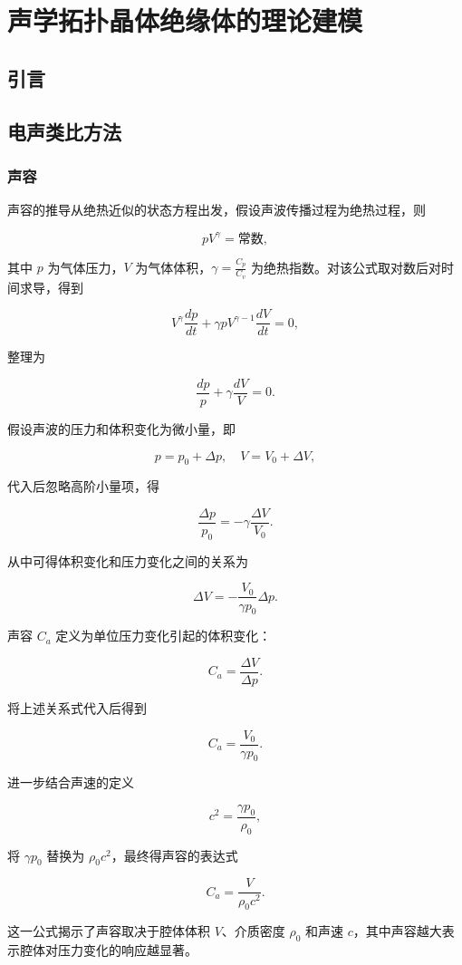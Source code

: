 \chapter{声学拓扑晶体绝缘体的理论建模}
\section{引言}

\section{电声类比方法}
\subsection{声容}
声容的推导从绝热近似的状态方程出发，假设声波传播过程为绝热过程，则

\[
pV^\gamma = \text{常数},
\]

其中 \(p\) 为气体压力，\(V\) 为气体体积，\(\gamma = \frac{C_p}{C_v}\) 为绝热指数。对该公式取对数后对时间求导，得到

\[
V^\gamma \frac{dp}{dt} + \gamma p V^{\gamma-1} \frac{dV}{dt} = 0,
\]

整理为

\[
\frac{dp}{p} + \gamma \frac{dV}{V} = 0.
\]

假设声波的压力和体积变化为微小量，即

\[
p = p_0 + \Delta p, \quad V = V_0 + \Delta V,
\]

代入后忽略高阶小量项，得

\[
\frac{\Delta p}{p_0} = -\gamma \frac{\Delta V}{V_0}.
\]

从中可得体积变化和压力变化之间的关系为

\[
\Delta V = -\frac{V_0}{\gamma p_0} \Delta p.
\]

声容 \(C_a\) 定义为单位压力变化引起的体积变化：

\[
C_a = \frac{\Delta V}{\Delta p}.
\]

将上述关系式代入后得到

\[
C_a = \frac{V_0}{\gamma p_0}.
\]

进一步结合声速的定义

\[
c^2 = \frac{\gamma p_0}{\rho_0},
\]

将 \(\gamma p_0\) 替换为 \(\rho_0 c^2\)，最终得声容的表达式

\[
C_a = \frac{V}{\rho_0 c^2}.
\]

这一公式揭示了声容取决于腔体体积 \(V\)、介质密度 \(\rho_0\) 和声速 \(c\)，其中声容越大表示腔体对压力变化的响应越显著。

